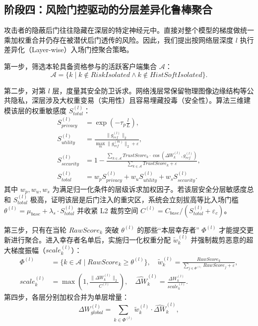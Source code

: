 \documentclass[runningheads]{llncs}
\begin{document}
\subsection{阶段四：风险门控驱动的分层差异化鲁棒聚合}
攻击者的隐蔽后门往往隐藏在深层的特定神经元中。直接对整个模型的梯度做统一乘加权重合并仍存在被潜伏后门透传的风险。因此，我们提出按网络层深度 $l$ 执行差异化（Layer-wise）入场门控聚合策略。

第一步，筛选本轮具备资格参与的活跃客户端集合 $\mathcal{A}$：
\begin{equation} \label{eq:active_clients}
    \mathcal{A} = \{k \mid k \notin RiskIsolated \land k \notin HistSoftIsolated\}.
\end{equation}

第二步，对第 $l$ 层，度量其安全防卫诉求。网络浅层常保留物理图像边缘结构等公共隐私，深层涉及大权重变易（实用性）且容易埋藏投毒（安全性）。算法三维建模该层的权重敏感度 $S_{total}^{(l)}$：
\begin{align}
    S_{privacy}^{(l)} &= \exp\left(-\tau_{p} \frac{l}{L}\right), \\
    S_{utility}^{(l)} &= \frac{\|g_{ref}^{(l)}\|_{2}}{\max_{m}\|g_{ref}^{(m)}\|_{2} + \varepsilon}, \\
    S_{security}^{(l)} &= 1 - \frac{\sum_{k\in\mathcal{A}}TrustScore_{k}\cdot\cos(\Delta W_{k}^{(l)}, g_{ref}^{(l)})}{\sum_{k\in\mathcal{A}}TrustScore_{k} + \varepsilon}, \\
    S_{total}^{(l)} &= w_p S_{privacy}^{(l)} + w_u S_{utility}^{(l)} + w_s S_{security}^{(l)}.
\end{align}
其中 $w_p, w_u, w_s$ 为满足归一化条件的层级诉求加权因子。若该层安全分层敏感度总和 $S_{total}^{(l)}$ 极高，证明该层是后门注入的重灾区，系统会立刻拔高等比入场门槛 $\theta^{(l)} = \mu_{base} + \lambda_{s} \cdot S_{total}^{(l)}$ 并收紧 L2 裁剪空间 $C^{(l)} = C_{base} / (S_{total}^{(l)} + \varepsilon_{c})$。

第三步，只有在当轮 $RawScore_k$ 突破 $\theta^{(l)}$ 的那些“本层幸存者” $\Phi^{(l)}$ 才能提交更新进行聚合。进入幸存者名单后，实施归一化权重分配 $\tilde{w}_{k}^{(l)}$ 并强制裁剪恶意的超大梯度振幅（$scale_k^{(l)}$）：
\begin{align}
    \Phi^{(l)} &= \{k \in \mathcal{A} \mid RawScore_{k} \ge \theta^{(l)} \}, \quad \tilde{w}_{k}^{(l)} = \frac{RawScore_{k}}{\sum_{j\in\Phi^{(l)}}RawScore_{j} + \varepsilon}, \\
    scale_{k}^{(l)} &= \max\left(1, \frac{\|\Delta W_{k}^{(l)}\|_{2}}{C^{(l)}}\right), \quad
    \widehat{\Delta W}_{k}^{(l)} = \frac{\Delta W_{k}^{(l)}}{scale_{k}^{(l)}}.
\end{align}
第四步，各层分别加权合并为单层增量：
\begin{equation}
    \Delta W_{global}^{(l)} = \sum_{k\in\Phi^{(l)}}\tilde{w}_{k}^{(l)} \cdot \widehat{\Delta W}_{k}^{(l)},
\end{equation}
\end{document}
